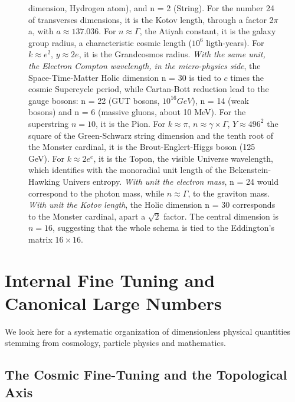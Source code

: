 \documentclass[twoside,draft]{article}
\begin{document}
\begin{sloppypar}
{\begin{figure}
{    dimension, Hydrogen atom), and n = 2 (String). For the number 24 of transverses dimensions, it is
    the Kotov length, through a factor 2$\pi$a, with $a \approx 137.036$. For $n \approx \Gamma $, the Atiyah constant, it is the galaxy group radius, a characteristic cosmic length ($10^{6}$ ligth-years). For $k \approx e^{2}$, $y\approx 2e$, it is 
    the Grandcosmos radius.
   \textit{With the same unit, the Electron Compton wavelength, in the micro-physics side}, the Space-Time-Matter
    Holic dimension n = 30 is tied to $c$ times the cosmic Supercycle period, while Cartan-Bott reduction lead to the gauge bosons:
    n = 22 (GUT bosons, $10^{16} GeV$), n = 14 (weak bosons) and n = 6 (massive gluons, about 10 MeV).
    For the superstring $n = 10$, it is the Pion. For $k \approx \pi$, $n \approx \gamma \times \Gamma$, $Y \approx 496^2$ 
    the square of the Green-Schwarz string dimension and the tenth root of the Monster cardinal, it is
    the Brout-Englert-Higgs boson (125 GeV). For $k \approx 2e^e$, it is the Topon, the visible Universe wavelength,
    which identifies with the monoradial unit length of the Bekenstein-Hawking Univers entropy.
   \textit{With unit the electron mass}, n = 24 would correspond to the photon mass, while $n \approx \Gamma$, 
    to the graviton mass.
    \textit{With unit the Kotov length}, the Holic dimension n = 30 corresponds to the Monster cardinal, 
    apart a $\sqrt2$ factor.}
    The central dimension is $n = 16$, suggesting that the whole schema is tied to the Eddington's matrix $16 \times 16$.
\label{fig:figure_label}
\end{figure}

\section {Internal Fine Tuning and Canonical Large Numbers}
We look here for a systematic organization of dimensionless physical quantities stemming from cosmology, particle physics and mathematics.
\subsection {The Cosmic Fine-Tuning and the Topological Axis}

}
\end{sloppypar}
\end{document}
